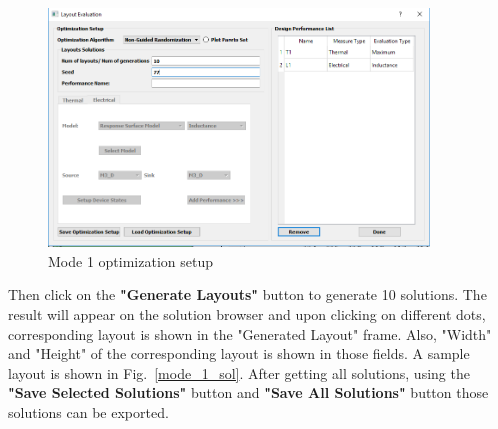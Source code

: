 \documentclass[11pt]{article}
\begin{document}
\begin{itemize}
    \begin{figure}[t]
    \centering
    \includegraphics[width=0.9\textwidth]{./figs/Test/Mode_1_opt_setup.PNG}
    \caption{Mode 1 optimization setup}
    \label{mode_1_opt}
    \end{figure}
     Then click on the \textbf{"Generate Layouts"} button to generate 10 solutions. The result will appear on the solution browser and upon clicking on different dots, corresponding layout is shown in the "Generated Layout" frame. Also, "Width" and "Height" of the corresponding layout is shown in those fields. A sample layout is shown in Fig.~\ref{mode_1_sol}. After getting all solutions, using the \textbf{"Save Selected Solutions"} button and \textbf{"Save All Solutions"} button those solutions can be exported.
     

\end{itemize}
\end{document}
